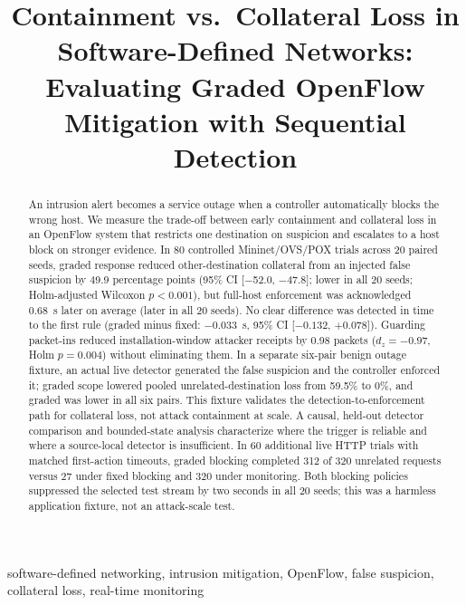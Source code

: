 \documentclass[conference]{IEEEtran}
\begin{document}
\title{Containment vs.\ Collateral Loss in Software-Defined Networks:\\
Evaluating Graded OpenFlow Mitigation with Sequential Detection}
\author{
}
\maketitle

\begin{abstract}
An intrusion alert becomes a service outage when a controller automatically blocks the wrong host.
We measure the trade-off between early containment and collateral loss in an OpenFlow system that
restricts one destination on suspicion and escalates to a host block on stronger evidence.
In 80 controlled Mininet/OVS/POX trials across 20 paired seeds, graded response reduced
other-destination collateral from an injected false suspicion by 49.9 percentage points
(95\% CI [$-$52.0, $-$47.8]; lower in all 20 seeds; Holm-adjusted Wilcoxon $p<0.001$),
but full-host enforcement was acknowledged 0.68~s later on average (later in all 20 seeds).
No clear difference was detected in time to the first rule (graded minus fixed:
$-0.033$~s, 95\% CI [$-0.132$, $+0.078$]). Guarding packet-ins reduced installation-window attacker receipts
by 0.98 packets ($d_z=-0.97$, Holm $p=0.004$) without eliminating them. In a separate six-pair benign
outage fixture, an actual live detector generated the false suspicion and the controller enforced
it; graded scope lowered pooled unrelated-destination loss from 59.5\% to 0\%, and graded was lower in all six pairs. This fixture validates the
detection-to-enforcement path for collateral loss, not attack containment at scale.
A causal, held-out detector comparison and bounded-state analysis characterize where the
trigger is reliable and where a source-local detector is insufficient. In 60 additional
live HTTP trials with matched first-action timeouts, graded blocking completed
312 of 320 unrelated requests versus 27 under fixed blocking and 320 under monitoring.
Both blocking policies suppressed the selected test stream by two seconds in all 20
seeds; this was a harmless application fixture, not an attack-scale test.
\end{abstract}
\begin{IEEEkeywords}
software-defined networking, intrusion mitigation, OpenFlow, false suspicion,
collateral loss, real-time monitoring
\end{IEEEkeywords}
\end{document}
